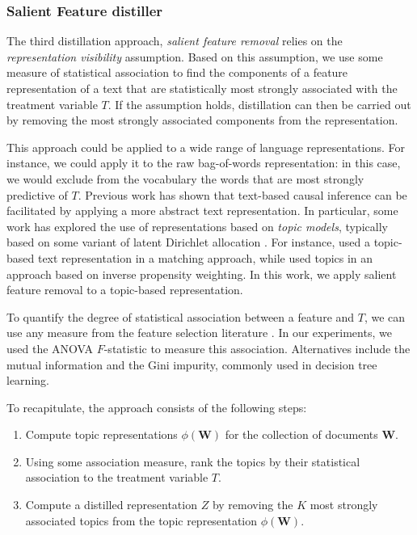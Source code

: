 \documentclass[11pt]{article}
\newcommand{\bW}{\bm{W}}  %
\begin{document}
\subsubsection{Salient Feature distiller}

The third distillation approach, \emph{salient feature removal} relies on the \emph{representation visibility} assumption.
Based on this assumption, we use some measure of statistical association to find the components of a feature representation of a text that are statistically most strongly associated with the treatment variable $T$.
%
If the assumption holds, distillation can then be carried out by removing the most strongly associated components from the representation.

This approach could be applied to a wide range of language representations. For instance, we could apply it to the raw bag-of-words representation: in this case, we would exclude from the vocabulary the words that are most strongly predictive of $T$.
%
Previous work has shown that text-based causal inference can be facilitated by applying a more abstract text representation.
In particular, some work has explored the use of representations based on \emph{topic models}, typically based on some variant of latent Dirichlet allocation \citep{blei2003}.
For instance, \citet{roberts2020} used a topic-based text representation in a matching approach, while \citet{sridhar2019} used topics in an approach based on inverse propensity weighting.
%
In this work, we apply salient feature removal to a topic-based representation.

To quantify the degree of statistical association between a feature and $T$, we can use any measure from the feature selection literature \citep{guyon2003}.
In our experiments, we used the ANOVA $F$-statistic to measure this association. Alternatives include the mutual information and the Gini impurity, commonly used in decision tree learning.


To recapitulate, the approach consists of the following steps:
\begin{enumerate}%
    \item Compute topic representations $\phi(\bW)$ for the collection of documents $\bW$.
    \item Using some association measure, rank the topics by their statistical association to the treatment variable $T$.
    \item Compute a distilled representation $Z$ by removing the $K$ most strongly associated topics from the topic representation $\phi(\bW)$.
\end{enumerate}
\end{document}
